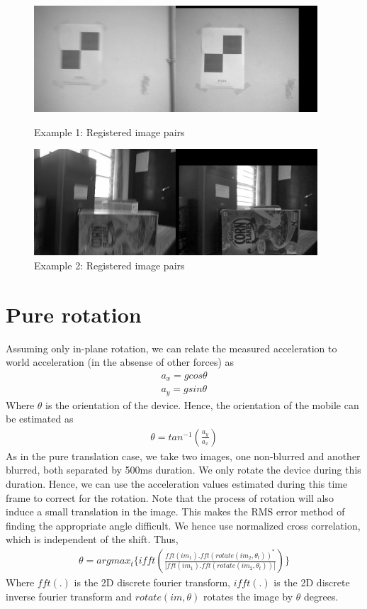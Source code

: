 \documentclass[BTech]{iitmdiss}
\begin{document}
\begin{figure}[ht]
\begin{center}
\includegraphics[width=300pt]{images/imreg/shift/eg1/imreg.png}
\caption{Example 1: Registered image pairs}
\includegraphics[width=300pt]{images/imreg/shift/eg2/imreg.png}
\caption{Example 2: Registered image pairs}
\end{center}
\end{figure}

\section{Pure rotation}
\label{image_registration:pure_rotation}
Assuming only in-plane rotation, we can relate the measured acceleration
to world acceleration (in the absense of other forces) as
\begin{align*}
a_x=gcos\theta\\
a_y=gsin\theta
\end{align*}
Where $\theta$ is the orientation of the device. Hence, the orientation
of the mobile can be estimated as
\begin{align*}
\theta=tan^{-1}(\frac{a_y}{a_x})
\end{align*}
As in the pure translation case, we take two images, one non-blurred and
another blurred, both separated by 500ms duration. We only rotate the 
device during this duration. Hence, we can use the acceleration values
estimated during this time frame to correct for the rotation. Note that
the process of rotation will also induce a small translation in the 
image. This makes the RMS error method of finding the appropriate
angle difficult. We hence use normalized cross correlation, which is 
independent of the shift. Thus,
\begin{align*}
\theta=argmax_t\big\{ifft(\frac{fft(im_1).fft(rotate(im_2,\theta_t))^*}
{|fft(im_1).fft(rotate(im_2,\theta_t))|})\}
\end{align*}
Where $fft(.)$ is the 2D discrete fourier transform, $ifft(.)$ is the 2D 
discrete inverse fourier transform and $rotate(im, \theta)$ rotates the
 image by $\theta$ degrees.
\end{document}
